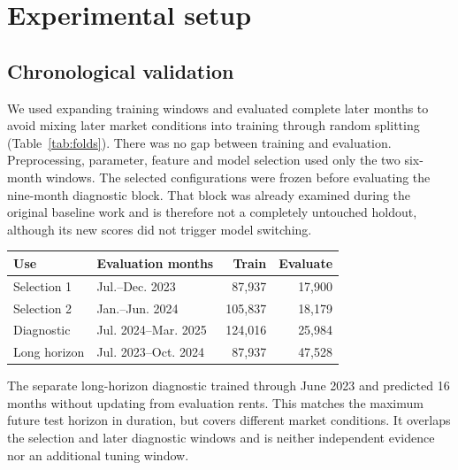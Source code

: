 \documentclass[conference]{IEEEtran}
\makeatletter
\newenvironment{localtable}{\par\addvspace{\medskipamount}\noindent
  \begin{minipage}{\columnwidth}\def\@captype{table}}{\end{minipage}\par
  \addvspace{\medskipamount}}
\makeatother
\begin{document}
\section{Experimental setup}
\label{sec:experiments}

\subsection{Chronological validation}
We used expanding training windows and evaluated complete later months
to avoid mixing later market conditions into training through random splitting
(Table~\ref{tab:folds}). There was no gap between training and evaluation.
Preprocessing, parameter, feature and model selection used only the two
six-month windows. The selected configurations were frozen before evaluating
the nine-month diagnostic block. That block was already examined during
the original baseline work and is therefore not a completely untouched
holdout, although its new scores did not trigger model switching.

\begin{localtable}
  \caption{Chronological evaluation. Counts refer to original labelled records.}
  \label{tab:folds}
  \centering\small
  \begin{tabularx}{\columnwidth}{lXrr}
    \toprule
    Use & Evaluation months & Train & Evaluate \\
    \midrule
    Selection 1 & Jul.--Dec. 2023 & 87,937 & 17,900 \\
    Selection 2 & Jan.--Jun. 2024 & 105,837 & 18,179 \\
    Diagnostic & Jul. 2024--Mar. 2025 & 124,016 & 25,984 \\
    Long horizon & Jul. 2023--Oct. 2024 & 87,937 & 47,528 \\
    \bottomrule
  \end{tabularx}
\end{localtable}

The separate long-horizon diagnostic trained through June 2023 and predicted
16 months without updating from evaluation rents. This matches the maximum
future test horizon in duration, but covers different market conditions.
It overlaps the selection and later diagnostic windows and is neither
independent evidence nor an additional tuning window.
\end{document}

